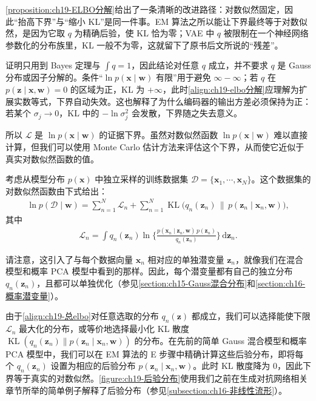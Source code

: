 \documentclass[../../main.tex]{subfiles}
\begin{document}
\begin{remark}
\cref{proposition:ch19-ELBO分解}给出了一条清晰的改进路径：对数似然固定，因此“抬高下界”与“缩小 KL”是同一件事。EM 算法之所以能让下界最终等于对数似然，是因为它取 $q$ 为精确后验，使 KL 恰为零；VAE 中 $q$ 被限制在一个神经网络参数化的分布族里，KL 一般不为零，这就留下了原书后文所说的“残差”。

证明只用到 Bayes 定理与 $\int q=1$，因此结论对任意 $q$ 成立，并不要求 $q$ 是 Gauss 分布或因子分解的。条件“$\ln p(\bm{x}\mid\bm{w})$ 有限”用于避免 $\infty-\infty$；若 $q$ 在 $p(\bm{z}\mid\bm{x},\bm{w})=0$ 的区域为正，KL 为 $+\infty$，此时\eqref{align:ch19-elbo分解}应理解为扩展实数等式，下界自动失效。这也解释了为什么编码器的输出方差必须保持为正：若某个 $\sigma_j\to0$，KL 中的 $-\ln\sigma_j^{2}$ 会发散，下界随之失去意义。
\end{remark}

所以 $\mathcal{L}$ 是 $\ln p(\bm{x}\mid\bm{w})$ 的证据下界。虽然对数似然函数 $\ln p(\bm{x}\mid\bm{w})$ 难以直接计算，但我们可以使用 Monte Carlo 估计方法来评估这个下界，从而使它近似于真实对数似然函数的值。

考虑从模型分布 $p(\bm{x})$ 中独立采样的训练数据集 $\mathcal{D}=\{\bm{x}_1,\cdots,\bm{x}_N\}$。这个数据集的对数似然函数由下式给出：
\begin{align}
\ln p(\mathcal{D}\mid\bm{w})=\sum_{n=1}^{N}\mathcal{L}_n+\sum_{n=1}^{N}\operatorname{KL}\big(q_n(\bm{z}_n)\,\|\,p(\bm{z}_n\mid\bm{x}_n,\bm{w})\big),
\label{align:ch19-总elbo}
\end{align}
其中
\begin{align}
\mathcal{L}_n=\int q_n(\bm{z}_n)\ln\Big\{\frac{p(\bm{x}_n\mid\bm{z}_n,\bm{w})\,p(\bm{z}_n)}{q_n(\bm{z}_n)}\Big\}\,\mathrm{d}\bm{z}_n.
\label{align:ch19-逐点elbo}
\end{align}

请注意，这引入了与每个数据向量 $\bm{x}_n$ 相对应的单独潜变量 $\bm{z}_n$，就像我们在混合模型和概率 PCA 模型中看到的那样。因此，每个潜变量都有自己的独立分布 $q_n(\bm{z}_n)$，且都可以单独优化（参见\cref{section:ch15-Gauss混合分布}和\cref{section:ch16-概率潜变量}）。

由于\eqref{align:ch19-总elbo}对任意选取的分布 $q_n(\bm{z})$ 都成立，我们可以选择能使下限 $\mathcal{L}_n$ 最大化的分布，或等价地选择最小化 KL 散度 $\operatorname{KL}(q_n(\bm{z}_n)\|p(\bm{z}_n\mid\bm{x}_n,\bm{w}))$ 的分布。在先前的简单 Gauss 混合模型和概率 PCA 模型中，我们可以在 EM 算法的 E 步骤中精确计算这些后验分布，即将每个 $q_n(\bm{z}_n)$ 设置为相应的后验分布 $p(\bm{z}_n\mid\bm{x}_n,\bm{w})$。此时 KL 散度降为 $0$，因此下界等于真实的对数似然。\cref{figure:ch19-后验分布}使用我们之前在生成对抗网络相关章节所举的简单例子解释了后验分布（参见\cref{subsection:ch16-非线性流形}）。
\end{document}
